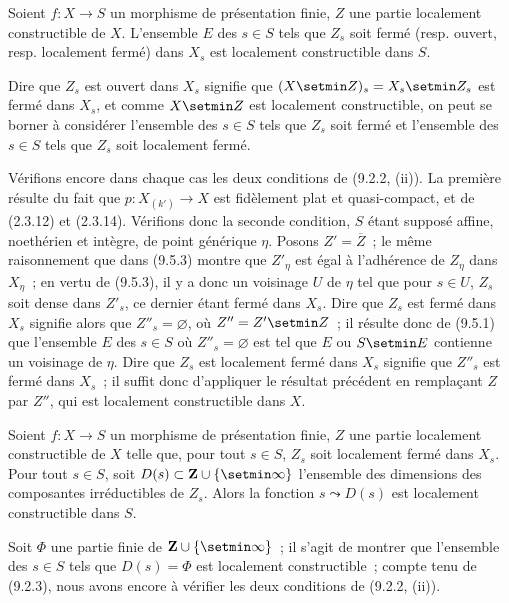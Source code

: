 \begin{corollary}[9.5.4]
\label{IV.9.5.4-fr}
Soient $f:X\to S$ un morphisme de présentation finie, $Z$ une partie
localement constructible de $X$. L'ensemble $E$ des $s\in S$ tels que $Z_s$
soit fermé \textnormal{(resp.} ouvert, \textup{resp.} localement fermé\textnormal{)}
dans $X_s$ est localement constructible dans $S$.
\end{corollary}

Dire que $Z_s$ est ouvert dans $X_s$ signifie que
$(X\setmin Z)_s=X_s\setmin Z_s$ est fermé dans $X_s$, et comme $X\setmin Z$ est localement
constructible, on peut se borner à considérer l'ensemble des $s\in S$ tels que
$Z_s$ soit fermé et l'ensemble des $s\in S$ tels que $Z_s$ soit localement
fermé.

Vérifions encore dans chaque cas les deux conditions de (9.2.2, (ii)). La
première résulte du fait que $p:X_{(k')}\to X$ est fidèlement plat et
quasi-compact, et de (2.3.12) et (2.3.14). Vérifions donc la seconde condition,
$S$ étant supposé affine, noethérien et intègre, de point générique $\eta$.
Posons $Z'=\overline Z$~; le même raisonnement que dans (9.5.3) montre que
$Z'_\eta$ est égal à l'adhérence de $Z_\eta$ dans $X_\eta$~; en vertu de
(9.5.3), il y a donc un voisinage $U$ de $\eta$ tel que pour $s\in U$, $Z_s$
soit dense dans $Z'_s$, ce dernier étant fermé dans $X_s$. Dire que $Z_s$ est
fermé dans $X_s$ signifie alors que $Z''_s=\varnothing$, où $Z''=Z'\setmin Z$~; il
résulte donc de (9.5.1) que l'ensemble $E$ des $s\in S$ où
$Z''_s=\varnothing$ est tel que $E$ ou $S\setmin E$ contienne un voisinage de
$\eta$. Dire que $Z_s$ est localement fermé dans $X_s$ signifie que $Z''_s$
est fermé dans $X_s$~; il suffit donc d'appliquer le résultat précédent en
remplaçant $Z$ par $Z''$, qui est localement constructible dans $X$.


\begin{proposition}[9.5.5]
\label{IV.9.5.5-fr}
Soient $f:X\to S$ un morphisme de présentation finie, $Z$ une partie
localement constructible de $X$ telle que, pour tout $s\in S$, $Z_s$ soit
localement fermé dans $X_s$. Pour tout $s\in S$, soit
$D(s)\subset\mathbf Z\cup\{\setmin\infty\}$ l'ensemble des dimensions des
composantes irréductibles de $Z_s$. Alors la fonction $s\leadsto D(s)$ est
localement constructible dans $S$.
\end{proposition}

Soit $\Phi$ une partie finie de $\mathbf Z\cup\{\setmin\infty\}$~; il s'agit de
montrer que l'ensemble des $s\in S$ tels que $D(s)=\Phi$ est localement
constructible~; compte tenu de (9.2.3), nous avons encore à vérifier les deux
conditions de (9.2.2, (ii)).


